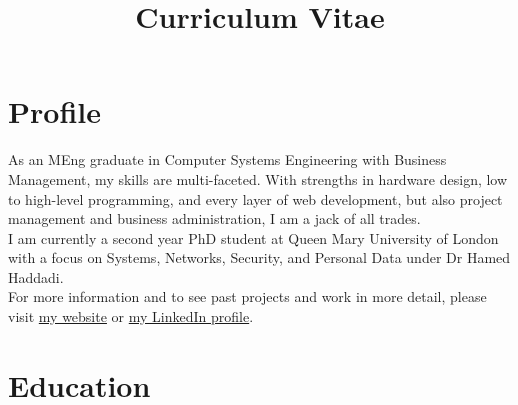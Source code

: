 \documentclass[10pt,a4paper,sans]{moderncv} %
\title{Curriculum Vitae}
\begin{document}
\makecvtitle

\section{Profile}

\hspace*{15pt}
As an MEng graduate in Computer Systems Engineering with Business Management, my skills are multi-faceted. With strengths in hardware design, low to high-level programming, and every layer of web development, but also project management and business administration, I am a jack of all trades.
\\[4pt]
\hspace*{15pt}
I am currently a second year PhD student at Queen Mary University of London with a focus on Systems, Networks, Security, and Personal Data under Dr Hamed Haddadi.
\\[4pt]
\hspace*{15pt}
For more information and to see past projects and work in more detail, please visit \href{http://yousefamar.com}{my website} or \href{https://linkedin.com/in/yousefamar}{my LinkedIn profile}.


\section{Education}
\end{document}
